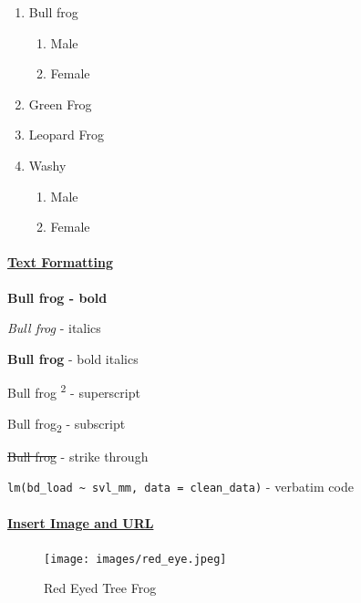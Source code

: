 \documentclass[
  letterpaper,
  DIV=11,
  numbers=noendperiod]{scrartcl}
\let\oldparagraph\paragraph
\renewcommand{\paragraph}[1]{\oldparagraph{#1}\mbox{}}
\providecommand{\tightlist}{%
  \setlength{\itemsep}{0pt}\setlength{\parskip}{0pt}}\usepackage{longtable,booktabs,array}
\begin{document}
\begin{enumerate}
\def\labelenumi{\arabic{enumi}.}
\item
  Bull frog

  \begin{enumerate}
  \def\labelenumii{\roman{enumii}.}
  \tightlist
  \item
    Male
  \item
    Female
  \end{enumerate}
\item
  Green Frog
\item
  Leopard Frog
\item
  Washy

  \begin{enumerate}
  \def\labelenumii{\roman{enumii}.}
  \tightlist
  \item
    Male
  \item
    Female
  \end{enumerate}
\end{enumerate}

\hypertarget{text-formatting}{%
\paragraph{\texorpdfstring{\ul{Text
Formatting}}{Text Formatting}}\label{text-formatting}}

\textbf{Bull frog - bold}

\emph{Bull frog} - italics

\textbf{Bull frog} - bold italics

Bull frog \textsuperscript{2} - superscript

Bull frog\textsubscript{2} - subscript

\st{Bull frog} - strike through

\texttt{lm(bd\_load\ \textasciitilde{}\ svl\_mm,\ data\ =\ clean\_data)}
- verbatim code

\hypertarget{insert-image-and-url}{%
\paragraph{\texorpdfstring{\ul{Insert Image and
URL}}{Insert Image and URL}}\label{insert-image-and-url}}

\begin{figure}

{\centering \texttt{[image: images/red\_eye.jpeg]}

}

\caption{Red Eyed Tree Frog}

\end{figure}
\end{document}

